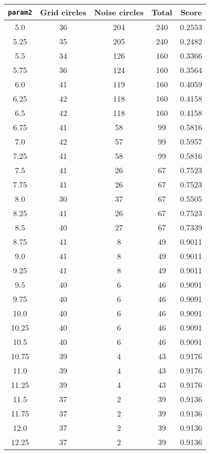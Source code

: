 \documentclass[letterpaper, 12pt]{article}
\begin{document}
\begin{longtable}{|c|c|c|c|c|}
\hline
\textbf{\texttt{param2}} & \textbf{Grid circles} & \textbf{Noise circles} & \textbf{Total} & \textbf{Score} \\
\hline
5.0 & 36 & 204 & 240 & 0.2553 \\
\hline
5.25 & 35 & 205 & 240 & 0.2482 \\
\hline
5.5 & 34 & 126 & 160 & 0.3366 \\
\hline
5.75 & 36 & 124 & 160 & 0.3564 \\
\hline
6.0 & 41 & 119 & 160 & 0.4059 \\
\hline
6.25 & 42 & 118 & 160 & 0.4158 \\
\hline
6.5 & 42 & 118 & 160 & 0.4158 \\
\hline
6.75 & 41 & 58 & 99 & 0.5816 \\
\hline
7.0 & 42 & 57 & 99 & 0.5957 \\
\hline
7.25 & 41 & 58 & 99 & 0.5816 \\
\hline
7.5 & 41 & 26 & 67 & 0.7523 \\
\hline
7.75 & 41 & 26 & 67 & 0.7523 \\
\hline
8.0 & 30 & 37 & 67 & 0.5505 \\
\hline
8.25 & 41 & 26 & 67 & 0.7523 \\
\hline
8.5 & 40 & 27 & 67 & 0.7339 \\
\hline
8.75 & 41 & 8 & 49 & 0.9011 \\
\hline
9.0 & 41 & 8 & 49 & 0.9011 \\
\hline
9.25 & 41 & 8 & 49 & 0.9011 \\
\hline
9.5 & 40 & 6 & 46 & 0.9091 \\
\hline
9.75 & 40 & 6 & 46 & 0.9091 \\
\hline
10.0 & 40 & 6 & 46 & 0.9091 \\
\hline
10.25 & 40 & 6 & 46 & 0.9091 \\
\hline
10.5 & 40 & 6 & 46 & 0.9091 \\
\hline
10.75 & 39 & 4 & 43 & 0.9176 \\
\hline
11.0 & 39 & 4 & 43 & 0.9176 \\
\hline
11.25 & 39 & 4 & 43 & 0.9176 \\
\hline
11.5 & 37 & 2 & 39 & 0.9136 \\
\hline
11.75 & 37 & 2 & 39 & 0.9136 \\
\hline
12.0 & 37 & 2 & 39 & 0.9136 \\
\hline
12.25 & 37 & 2 & 39 & 0.9136 \\
\hline

\end{longtable}
\end{document}
